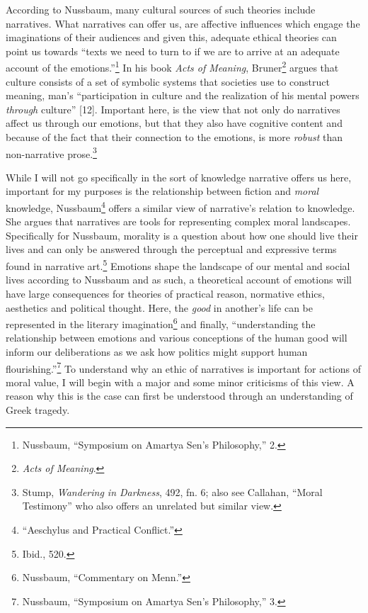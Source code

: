 \documentclass[phdthesis,12pt,final,a4paper]{wuthesis}
\theoremstyle{definition}
\theoremstyle{definition}
\theoremstyle{definition}
\theoremstyle{definition}
\theoremstyle{remark}
\begin{document}
According to Nussbaum, many cultural sources of such theories include narratives. What narratives can offer us, are affective influences which engage the imaginations of their audiences and given this, adequate ethical theories can point us towards ``texts we need to turn to if we are to arrive at an adequate account of the emotions.''\footnote{Nussbaum, {``Symposium on {Amartya Sen}'s Philosophy,''} 2.} In his book \emph{Acts of Meaning}, Bruner\footnote{\emph{Acts of Meaning}.} argues that culture consists of a set of symbolic systems that societies use to construct meaning, man's ``participation in culture and the realization of his mental powers \emph{through} culture'' {[}12{]}. Important here, is the view that not only do narratives affect us through our emotions, but that they also have cognitive content and because of the fact that their connection to the emotions, is more \emph{robust} than non-narrative prose.\footnote{Stump, \emph{Wandering in {Darkness}}, 492, fn. 6; also see Callahan, {``Moral {Testimony}''} who also offers an unrelated but similar view.}

While I will not go specifically in the sort of knowledge narrative offers us here, important for my purposes is the relationship between fiction and \emph{moral} knowledge, Nussbaum\footnote{{``Aeschylus and Practical Conflict.''}} offers a similar view of narrative's relation to knowledge. She argues that narratives are tools for representing complex moral landscapes. Specifically for Nussbaum, morality is a question about how one should live their lives and can only be answered through the perceptual and expressive terms found in narrative art.\footnote{Ibid., 520.} Emotions shape the landscape of our mental and social lives according to Nussbaum and as such, a theoretical account of emotions will have large consequences for theories of practical reason, normative ethics, aesthetics and political thought. Here, the \emph{good} in another's life can be represented in the literary imagination\footnote{Nussbaum, {``Commentary on {Menn}.''}} and finally, ``understanding the relationship between emotions and various conceptions of the human good will inform our deliberations as we ask how politics might support human flourishing.''\footnote{Nussbaum, {``Symposium on {Amartya Sen}'s Philosophy,''} 3.} To understand why an ethic of narratives is important for actions of moral value, I will begin with a major and some minor criticisms of this view. A reason why this is the case can first be understood through an understanding of Greek tragedy.
\end{document}
